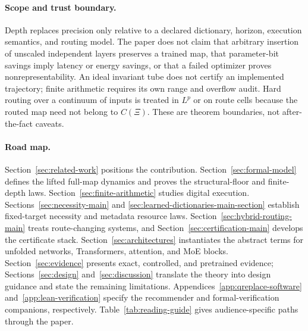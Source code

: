 \documentclass[twoside,11pt]{article}
\begin{document}
\paragraph{Scope and trust boundary.}
Depth replaces precision only relative to a declared dictionary, horizon,
execution semantics, and routing model.  The paper does not claim that
arbitrary insertion of unscaled independent layers preserves a trained map,
that parameter-bit savings imply latency or energy savings, or that a failed
optimizer proves nonrepresentability.  An ideal invariant tube does not
certify an implemented trajectory; finite arithmetic requires its own range
and overflow audit.  Hard routing over a continuum of inputs is treated in
$L^p$ or on route cells because the routed map need not belong to $C(\Xi)$.
These are theorem boundaries, not after-the-fact caveats.

\paragraph{Road map.}
Section~\ref{sec:related-work} positions the contribution.  Section~\ref{sec:formal-model}
defines the lifted full-map dynamics and proves the structural-floor and
finite-depth laws.  Section~\ref{sec:finite-arithmetic} studies digital
execution.  Sections~\ref{sec:necessity-main} and
\ref{sec:learned-dictionaries-main-section} establish fixed-target necessity
and metadata resource laws.  Section~\ref{sec:hybrid-routing-main} treats
route-changing systems, and Section~\ref{sec:certification-main} develops the
certificate stack.  Section~\ref{sec:architectures} instantiates the abstract
terms for unfolded networks, Transformers, attention, and MoE blocks.
Section~\ref{sec:evidence} presents exact, controlled, and pretrained evidence;
Sections~\ref{sec:design} and~\ref{sec:discussion} translate the theory into
design guidance and state the remaining limitations.  Appendices~\ref{app:qreplace-software}
and~\ref{app:lean-verification} specify the recommender and formal-verification
companions, respectively.  Table~\ref{tab:reading-guide} gives audience-specific paths through the paper.
\end{document}
